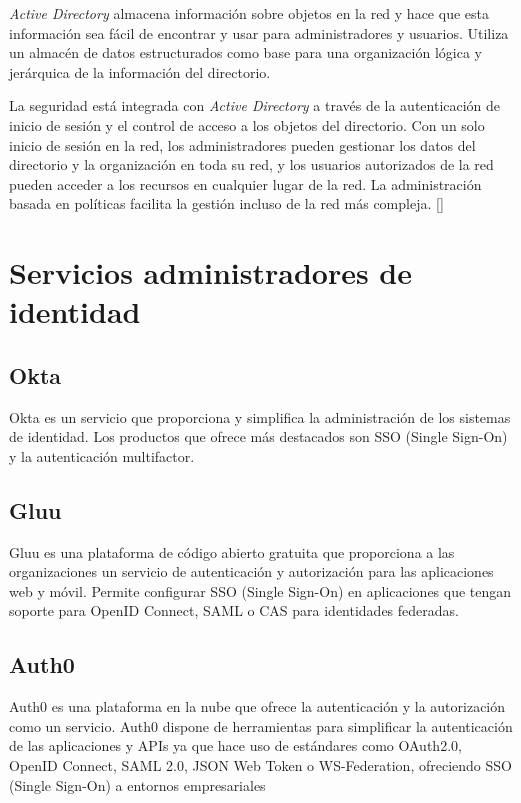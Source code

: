 \textit{Active Directory} almacena información sobre objetos en la red y hace que esta información sea fácil de encontrar y usar para administradores y usuarios. Utiliza un almacén de datos estructurados como base para una organización lógica y jerárquica de la información del directorio.

La seguridad está integrada con \textit{Active Directory }a través de la autenticación de inicio de sesión y el control de acceso a los objetos del directorio. Con un solo inicio de sesión en la red, los administradores pueden gestionar los datos del directorio y la organización en toda su red, y los usuarios autorizados de la red pueden acceder a los recursos en cualquier lugar de la red. La administración basada en políticas facilita la gestión incluso de la red más compleja.
[\cite{active-directoy-doc}]



\section*{Servicios administradores de identidad}

\subsection*{Okta}
Okta es un servicio que proporciona y simplifica la administración de los sistemas de identidad. Los productos que ofrece más destacados son SSO (Single Sign-On) y la autenticación multifactor.

%

\subsection*{Gluu}
Gluu es una plataforma de código abierto gratuita que proporciona a las organizaciones un servicio de autenticación y autorización para las aplicaciones web y móvil. Permite configurar SSO (Single Sign-On) en aplicaciones que tengan soporte para OpenID Connect, SAML o  CAS para identidades federadas.

\subsection*{Auth0}
Auth0 es una plataforma en la nube que ofrece la autenticación y la autorización como un servicio. Auth0 dispone de herramientas para simplificar la autenticación de las aplicaciones y APIs ya que hace uso de estándares como OAuth2.0, OpenID Connect, SAML 2.0, JSON Web Token o WS-Federation, ofreciendo SSO (Single Sign-On) a entornos empresariales

